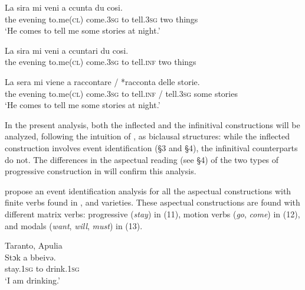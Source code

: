 \documentclass[output=paper]{langsci/langscibook}
\begin{document}
\ea%
    \label{ex:lorusso:8}
    \gll La  sira    mi    veni    a  ccunta    du   cosi.\\
         the  evening  to.me\textsc{(cl)}  come.\textsc{3sg}  to tell.\textsc{3sg} two  things\\
    \glt ‘He comes to tell me some stories at night.’
    \z


\ea%
    \label{ex:lorusso:9}
    \gll La  sira    mi    veni     a  ccuntari  du   cosi. \\
         the  evening  to.me\textsc{(cl)}  come.\textsc{3sg}  to  tell.\textsc{inf} two  things\\
    \z



\ea%
    \label{ex:lorusso:10}
    \gll La  sera    mi    viene     a   raccontare / *racconta  delle  storie.\\
         the  evening  to.me\textsc{(cl)} come.\textsc{3sg}  to  tell.\textsc{inf} / tell.\textsc{3sg}  some  stories\\
    \glt ‘He comes to tell me some stories at night.’ \citep{Di2015}
    \z


In the present analysis, both the inflected and the infinitival constructions will be analyzed, following the intuition of \citet[1:688]{Manzini2005}, as biclausal structures: while the inflected construction involves event identification (§3 and §4), the infinitival counterparts do not. The differences in the aspectual reading (see §4) of the two types of progressive construction in  will confirm this analysis.

\citet[I:688--689]{Manzini2005} propose an event identification analysis for all the aspectual constructions with finite verbs found in ,  and  varieties. These aspectual constructions are found with different matrix verbs: progressive (\textit{stay}) in (11), motion verbs (\textit{go}, \textit{come}) in (12), and modals (\textit{want}, \textit{will}, \textit{must}) in (13).

\ea%
         Taranto, Apulia\label{ex:lorusso:11}\\
    \gll Stɔk    a  bbeivə.     \\
         stay.\textsc{1sg}  to  drink.\textsc{1sg}    \\
    \glt ‘I am drinking.’
\z
\end{document}
